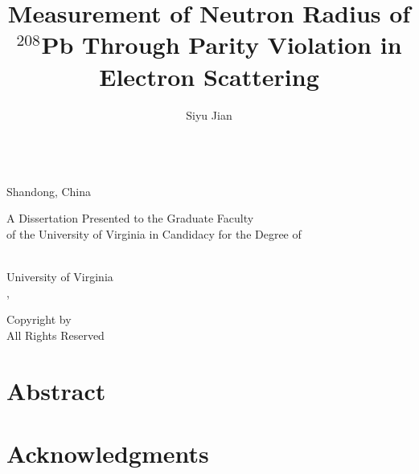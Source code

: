\title{Measurement of Neutron Radius of $^{208}$Pb Through Parity Violation in Electron Scattering}

\makeatletter
\author{Siyu Jian} \let\Author\@author
\newcommand{\hometown}{Shandong, China}


 \let\Year\@degreeyear
{}
\makeatother


\makeatletter
\def\maketitle{\begin{titlepage}
\doublespacing
\vspace{0.0in}
\large
{\LARGE\bf \@title \par}
\@author \\
\hometown
\par
\@prevdegrees
\par
A Dissertation Presented to the Graduate Faculty \\
of the University of Virginia in Candidacy for the Degree of \\
\@degree
\par
\@department \\
University of Virginia \\
\@degreemonth, \@degreeyear \\
\vspace{1.0in}

\begin{flushright}
\begin{minipage}{0.45\linewidth}
\mysignrule{}
\mysignrule{}
\mysignrule{}
\mysignrule{}
\end{minipage}
\end{flushright}

\end{titlepage}}
\makeatother
\maketitle

\pagestyle{plain}
\newpage
\vspace*{\fill}
\noindent \textcopyright Copyright by \Author {} \Year \\
All Rights Reserved

\cleardoublepage

\vspace{0.8in}
\section*{\center Abstract}


\cleardoublepage

\section*{Acknowledgments}

